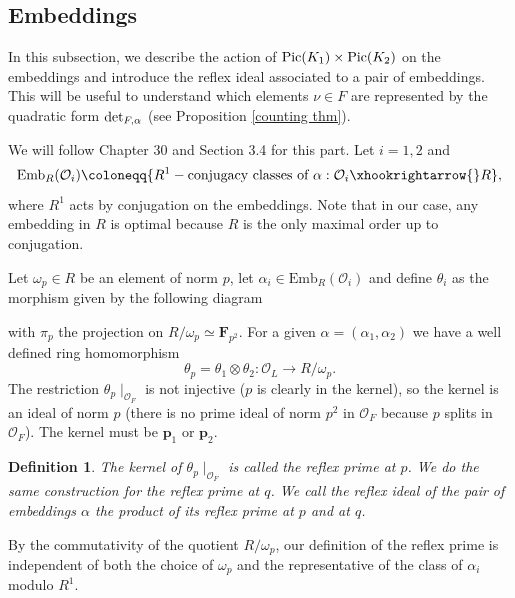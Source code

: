 \documentclass[a4paper,12pt]{article}
\newtheorem{definition}[theorem]{Definition}
\begin{document}
\subsection{Embeddings}
In this subsection, we describe the action of $\textup{Pic}(K_1)\times\textup{Pic}(K_2)$ on the embeddings and introduce the reflex ideal associated to a pair of embeddings. This will be useful to understand which elements $\nu\in F$ are represented by the quadratic form $\textup{det}_{F,\alpha}$ (see Proposition \ref{counting thm}).
\par
We will follow \cite{Voightquaternion} Chapter 30 and \cite{Daas} Section 3.4 for this part.
Let $i=1,2$ and 
\[\text{Emb}_R(\mathcal{O}_i)\coloneqq \{R^1-\text{conjugacy classes of  } \alpha:\mathcal{O}_i\xhookrightarrow{} R \},\] 
where $R^1$ acts by conjugation on the embeddings. Note that in our case, any embedding in $R$ is optimal because $R$ is the only maximal order up to conjugation.
\par
Let $\omega_p\in R$ be an element of norm $p$, let $\alpha_i\in\text{Emb}_R(\mathcal{O}_{i})$ and define $\theta_i$ as the morphism given by the following diagram
\begin{center}
\end{center}
with $\pi_p$ the projection on $R/\omega_p\simeq\mathbf{F}_{p^2}$. 
For a given $\alpha=(\alpha_1,\alpha_2)$ we have a well defined ring homomorphism 
\begin{equation}
\theta_p=\theta_1\otimes\theta_2:\mathcal{O}_L\rightarrow R/\omega_p.
\end{equation}
The restriction $\theta_p\mid_{\mathcal{O}_F}$ is not injective ($p$ is clearly in the kernel), so the kernel is an ideal of norm $p$ (there is no prime ideal of norm $p^2$ in $\mathcal{O}_F$ because $p$ splits in $\mathcal{O}_F$). The kernel must be $\mathbf{p}_1$ or $\mathbf{p}_2$. 
\begin{definition}
    The kernel of $\theta_p\mid_{\mathcal{O}_F}$ is called the reflex prime at $p$. We do the same construction for the reflex prime at $q$. We call the reflex ideal of the pair of embeddings $\alpha$ the product of its reflex prime at $p$ and at $q$.
\end{definition}
    By the commutativity of the quotient $R/\omega_p$, our definition of the reflex prime is independent of both the choice of $\omega_p$ and the representative of the class of $\alpha_i$ modulo $R^1$.
\end{document}
